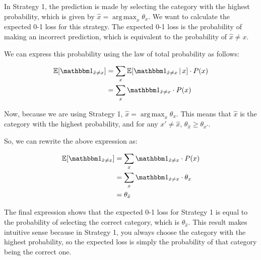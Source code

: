 \documentclass[a4paper]{article}
\theoremstyle{definition}
\DeclareMathOperator*{\argmax}{arg\,max}
\def\E{\mathbb E}
\def\ind{\mathbbm 1}
\newenvironment{soln}{
    \leavevmode\color{blue}\ignorespaces
}{}
\begin{document}
\begin{soln}

    In Strategy 1, the prediction is made by selecting the category with the highest probability, which is given by $\hat x = \argmax_x \theta_x$. We want to calculate the expected 0-1 loss for this strategy. The expected 0-1 loss is the probability of making an incorrect prediction, which is equivalent to the probability of $\hat x \neq x$. 

    We can express this probability using the law of total probability as follows:

    \[
    \begin{align*}
    \E[\ind_{\hat x \neq x}] &= \sum_{x} \E[\ind_{\hat x \neq x} \,|\, x] \cdot P(x) \\
    &= \sum_{x} \ind_{\hat x \neq x} \cdot P(x)
    \end{align*}
    \]

    Now, because we are using Strategy 1, $\hat x = \argmax_x \theta_x$. This means that $\hat x$ is the category with the highest probability, and for any $x' \neq \hat x$, $\theta_{\hat x} \geq \theta_{x'}$. 

    So, we can rewrite the above expression as:

    \[
    \begin{align*}
    \E[\ind_{\hat x \neq x}] &= \sum_{x} \ind_{\hat x \neq x} \cdot P(x) \\
    &= \sum_{x} \ind_{\hat x \neq x} \cdot \theta_x \\
    &= \theta_{\hat x}
    \end{align*}
    \]

    The final expression shows that the expected 0-1 loss for Strategy 1 is equal to the probability of selecting the correct category, which is $\theta_{\hat x}$. This result makes intuitive sense because in Strategy 1, you always choose the category with the highest probability, so the expected loss is simply the probability of that category being the correct one.

\end{soln}
\end{document}
